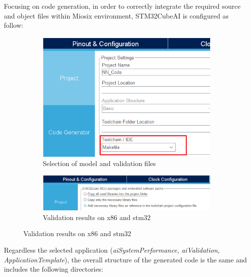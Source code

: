 Focusing on code generation, in order to correctly integrate the required source and object files within Miosix environment, STM32CubeAI is configured as follow:
\begin{center}
	\begin{figure}[h]
		\begin{subfigure}[H]{0.5\textwidth}
			\hfill\includegraphics[scale=0.55]{figures/stm32cubemx_conf2.png}\hspace*{\fill}
			\caption{Selection of model and validation files}\label{fig:23a}
		\end{subfigure}
		\hfill
		\begin{subfigure}[h]{0.5\textwidth}
			\hfill\includegraphics[scale=0.55]{figures/stm32cubemx_conf1.png}\hspace*{\fill}
			\caption{Validation results on x86 and stm32}\label{fig:23b}
		\end{subfigure}
	\end{figure}
\end{center}
Regardless the selected application (\textit{aiSystemPerformance, aiValidation, ApplicationTemplate}), the overall structure of the generated code is the same and includes the following directories:


